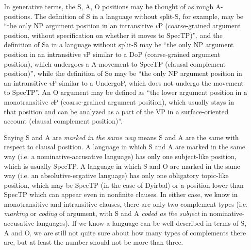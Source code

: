 \documentclass{article}
\newcommand*{\term}[1]{\emph{#1}}
\newcommand*{\vP}{\textit{v}P}
\begin{document}
In generative terms, the S, A, O positions may be thought of as rough A-positions. 
The definition of S in a language without split-S, for example, may be 
``the only NP argument position in an intransitive \vP{}
(coarse-grained argument position, without specification on whether it moves to SpecTP)'',
and the definition of Sa in a language without split-S may be 
``the only NP argument position in an intransitive \vP{} similar to a DoP (coarse-grained argument position),
which undergoes a A-movement to SpecTP (clausal complement position)'',
while the definition of So may be 
``the only NP argument position in an intransitive \vP{} similar to a UndergoP,
which does not undergo the movement to SpecTP''.
An O argument may be defined as ``the lower argument position in a monotransitive \vP{} 
(coarse-grained argument position),
which usually stays in that position and can be analyzed as a part of the VP in a surface-oriented account
(clausal complement position)''.

Saying S and A are \term{marked in the same way} means S and A are the same with respect to clausal position.
A language in which S and A are marked in the same way (i.e. a nominative-accusative language)
has only one subject-like position, which is usually SpecTP.
A language in which S and O are marked in the same way (i.e. an absolutive-ergative language)
has only one obligatory topic-like position,
which may be SpecTP (in the case of Dyirbal) 
or a position lower than SpecTP which can appear even in nonfinite clauses.
In either case, we know in monotransitive and intransitive clauses,
there are only two complement types (i.e. \term{marking} or \term{coding} of argument,
with S and A \term{coded as the subject} in nominative-accusative languages).
If we know a language can be well described in terms of S, A and O,
we are still not quite sure about how many types of complements there are,
but at least the number should not be more than three.
\end{document}
